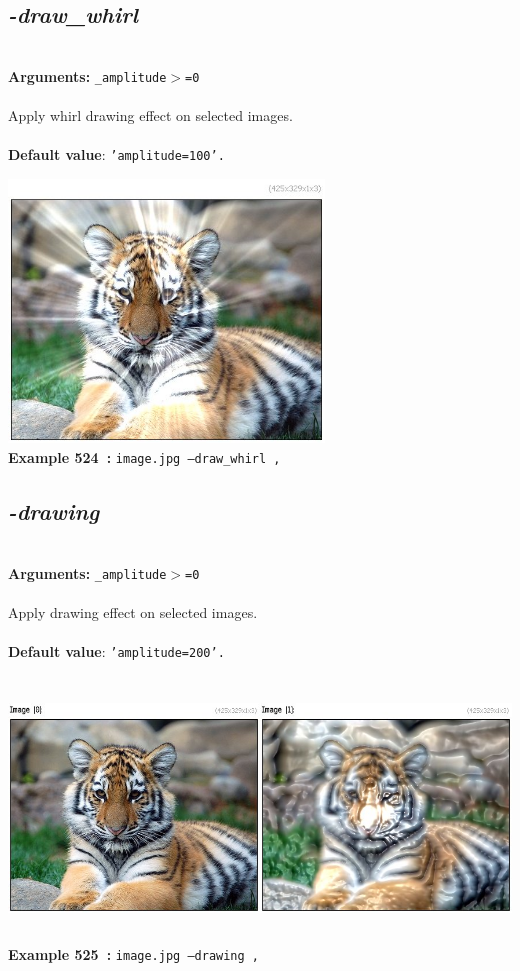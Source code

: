 \documentclass[a4paper,11pt,twoside]{book}
\begin{document}
\subsection{\emph{-draw\_whirl} }\vspace*{-0.5em}
~\\\textbf{Arguments: } 
{\small \texttt{\_amplitude$>$=0}}\\~\\
Apply whirl drawing effect on selected images.
~\\~\\\textbf{Default value}: {\small \texttt{'amplitude=100'.}}
\begin{center}\includegraphics[keepaspectratio=true,height=7cm,width=\textwidth]{img/gmic_def524.jpg}\\
{\footnotesize \textbf{Example 524~:} \texttt{image.jpg --draw\_whirl ,}}
\end{center}

\subsection{\emph{-drawing} }\vspace*{-0.5em}
~\\\textbf{Arguments: } 
{\small \texttt{\_amplitude$>$=0}}\\~\\
Apply drawing effect on selected images.
~\\~\\\textbf{Default value}: {\small \texttt{'amplitude=200'.}}
\begin{center}\includegraphics[keepaspectratio=true,height=7cm,width=\textwidth]{img/gmic_def525.jpg}\\
{\footnotesize \textbf{Example 525~:} \texttt{image.jpg --drawing ,}}
\end{center}
\end{document}
